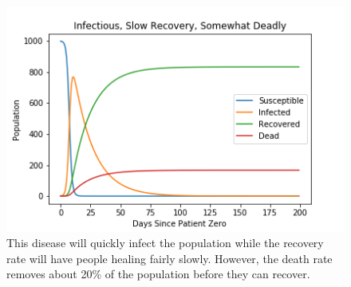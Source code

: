 \documentclass{article}
\begin{document}
\begin{figure}[H]
    \centering
    \captionsetup{justification=centering}
    \includegraphics[width=0.8\linewidth]{images/withD.png}
    \caption{This disease will quickly infect the population while the recovery rate will have people healing fairly slowly. However, the death rate removes about 20\% of the population before they can recover.}
    \label{fig:D}
\end{figure}
\end{document}
